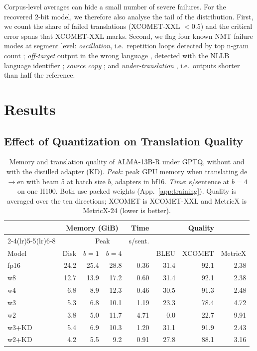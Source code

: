 \documentclass[10pt]{article}
\begin{document}
Corpus-level averages can hide a small number of severe failures. For the
recovered 2-bit model, we therefore also analyse the tail of the distribution.
First, we count the share of failed translations (XCOMET-XXL $<0.5$) and the
critical error spans that XCOMET-XXL marks. Second, we flag four known NMT failure
modes at segment level: \emph{oscillation}, i.e.\ repetition loops detected by
top n-gram count \citep{raunak2021curious,guerreiro2023hallucinations};
\emph{off-target} output in the wrong language \citep{zhang2020improving},
detected with the NLLB language identifier \citep{nllb2022,joulin2017bag};
\emph{source copy} \citep{ott2018analyzing}; and \emph{under-translation}
\citep{tu2016modeling}, i.e.\ outputs shorter than half the reference.



\section{Results}

\subsection{Effect of Quantization on Translation Quality}

\begin{table}[h]
\centering
\footnotesize
\setlength{\tabcolsep}{1.6pt}
\begin{tabular}{lrrrrrrr}
\toprule
 & \multicolumn{3}{c}{Memory (GiB)} & Time & \multicolumn{3}{c}{Quality} \\
\cmidrule(lr){2-4}\cmidrule(lr){5-5}\cmidrule(lr){6-8}
 & & \multicolumn{2}{c}{Peak} & s/sent. & & & \\
Model & Disk & $b{=}1$ & $b{=}4$ &  & BLEU & XCOMET & MetricX \\
\midrule
fp16 & 24.2 & 25.4 & 28.8 & 0.36 & 31.4 & 92.1 & 2.38 \\
w8   & 12.7 & 13.9 & 17.2 & 0.60 & 31.4 & 92.1 & 2.38 \\
w4   &  6.8 &  8.9 & 12.3 & 0.46 & 30.5 & 91.3 & 2.48 \\
w3   &  5.3 &  6.8 & 10.1 & 1.19 & 23.3 & 78.4 & 4.72 \\
w2   &  3.8 &  5.0 & 11.7 & 4.71 &  0.0 & 22.7 & 9.91 \\
\midrule
w3+KD & 5.4 & 6.9 & 10.3 & 1.20 & 31.1 & 91.9 & 2.43 \\
w2+KD & 4.2 & 5.5 &  9.2 & 0.91 & 27.8 & 88.1 & 3.16 \\
\bottomrule
\end{tabular}
\caption{Memory and translation quality of ALMA-13B-R under GPTQ, without and
with the distilled adapter (KD). \emph{Peak}: peak GPU memory when translating
de$\rightarrow$en with beam 5 at batch size $b$, adapters in bf16.
\emph{Time}: s/sentence at $b{=}4$ on one H100. Both use packed weights (App.~\ref{app:training}).
Quality is averaged over the ten directions; XCOMET is XCOMET-XXL and MetricX is
MetricX-24 (lower is better).}
\label{tab:main}
\end{table}
\end{document}
